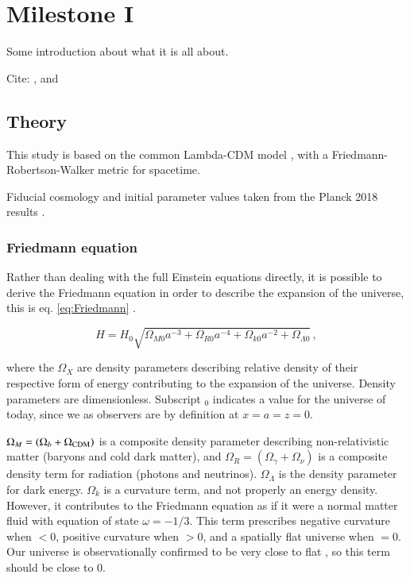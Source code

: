 \section{Milestone I}\label{sec:milestone_1}
Some introduction about what it is all about.

Cite: \citet{baumannLectureNotesCosmology2017}, \citet{dodelsonModernCosmology2003} and \citep{callinHowCalculateCMB2006, wintherCosmologyIILecture2024, huCompleteTreatmentCMB1998}

\subsection{Theory}
This study is based on the common Lambda-CDM model \citep[chap. 1][sec. 1.6]{dodelsonModernCosmology2021}, with a Friedmann-Robertson-Walker metric for spacetime.

Fiducial cosmology and initial parameter values taken from the Planck 2018 results \citep{collaborationPlanck2018Results2020}.

\subsubsection{Friedmann equation}
Rather than dealing with the full Einstein equations directly, it is possible to derive the Friedmann equation in order to describe the expansion of the universe, this is eq. \ref{eq:Friedmann} \citep{wintherCosmologyIILecture2024}.

\begin{equation}\label{eq:Friedmann}
\boxed{H = H_0 \sqrt{ \Omega_{M 0} a^{-3} + \Omega_{R 0} a^{-4} + \Omega_{k 0} a^{-2} + \Omega_{\Lambda 0}}}\,,
\end{equation}

where the $\Omega_{X}$ are density parameters describing relative density of their respective form of energy contributing to the expansion of the universe. Density parameters are dimensionless. Subscript $_0$ indicates a value for the universe of today, since we as observers are by definition at $x=a=z=0$.

$\Omega_{M} = (\Omega_{b}+\Omega_{\rm CDM})$ is a composite density parameter describing non-relativistic matter (baryons and cold dark matter), and $\Omega_{R} = (\Omega_{\gamma} + \Omega_{\nu})$ is a composite density term for radiation (photons and neutrinos).
$\Omega_{\Lambda}$ is the density parameter for dark energy.
$\Omega_{k}$ is a curvature term, and not properly an energy density. However, it contributes to the Friedmann equation as if it were a normal matter fluid with equation of state $\omega = -1/3$. This term prescribes negative curvature when $<0$, positive curvature when $>0$, and a spatially flat universe when $=0$. Our universe is observationally confirmed to be very close to flat \citep{bennettNineYearWilkinsonMicrowave2013}, so this term should be close to $0$. 

